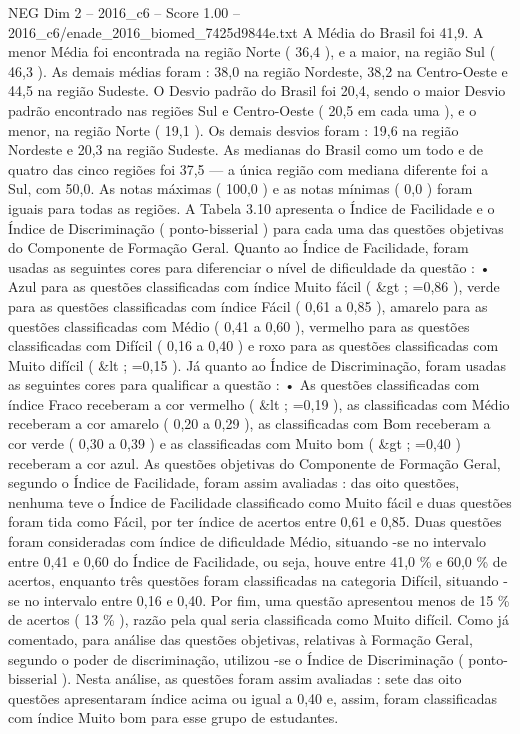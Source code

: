 \begin{textsample}{NEG Dim 2 – 2016\_c6 – Score 1.00 – 2016\_c6/enade\_2016\_biomed\_7425d9844e.txt}
A Média do Brasil foi 41,9.
A menor Média foi encontrada na região Norte ( 36,4 ), e a maior, na região Sul ( 46,3 ).
As demais médias foram : 38,0 na região Nordeste, 38,2 na Centro-Oeste e 44,5 na região Sudeste.
O Desvio padrão do Brasil foi 20,4, sendo o maior Desvio padrão encontrado nas regiões Sul e Centro-Oeste ( 20,5 em cada uma ), e o menor, na região Norte ( 19,1 ).
Os demais desvios foram : 19,6 na região Nordeste e 20,3 na região Sudeste.
As medianas do Brasil como um todo e de quatro das cinco regiões foi 37,5 — a única região com mediana diferente foi a Sul, com 50,0.
As notas máximas ( 100,0 ) e as notas mínimas ( 0,0 ) foram iguais para todas as regiões.
A Tabela 3.10 apresenta o Índice de Facilidade e o Índice de Discriminação ( ponto-bisserial ) para cada uma das questões objetivas do Componente de Formação Geral.
Quanto ao Índice de Facilidade, foram usadas as seguintes cores para diferenciar o nível de dificuldade da questão : • Azul para as questões classificadas com índice Muito fácil ( \&gt ; =0,86 ), verde para as questões classificadas com índice Fácil ( 0,61 a 0,85 ), amarelo para as questões classificadas com Médio ( 0,41 a 0,60 ), vermelho para as questões classificadas com Difícil ( 0,16 a 0,40 ) e roxo para as questões classificadas com Muito difícil ( \&lt ; =0,15 ).
Já quanto ao Índice de Discriminação, foram usadas as seguintes cores para qualificar a questão : • As questões classificadas com índice Fraco receberam a cor vermelho ( \&lt ; =0,19 ), as classificadas com Médio receberam a cor amarelo ( 0,20 a 0,29 ), as classificadas com Bom receberam a cor verde ( 0,30 a 0,39 ) e as classificadas com Muito bom ( \&gt ; =0,40 ) receberam a cor azul.
As questões objetivas do Componente de Formação Geral, segundo o Índice de Facilidade, foram assim avaliadas : das oito questões, nenhuma teve o Índice de Facilidade classificado como Muito fácil e duas questões foram tida como Fácil, por ter índice de acertos entre 0,61 e 0,85.
Duas questões foram consideradas com índice de dificuldade Médio, situando -se no intervalo entre 0,41 e 0,60 do Índice de Facilidade, ou seja, houve entre 41,0 \% e 60,0 \% de acertos, enquanto três questões foram classificadas na categoria Difícil, situando -se no intervalo entre 0,16 e 0,40.
Por fim, uma questão apresentou menos de 15 \% de acertos ( 13 \% ), razão pela qual seria classificada como Muito difícil.
Como já comentado, para análise das questões objetivas, relativas à Formação Geral, segundo o poder de discriminação, utilizou -se o Índice de Discriminação ( ponto-bisserial ).
Nesta análise, as questões foram assim avaliadas : sete das oito questões apresentaram índice acima ou igual a 0,40 e, assim, foram classificadas com índice Muito bom para esse grupo de estudantes.

\end{textsample}
